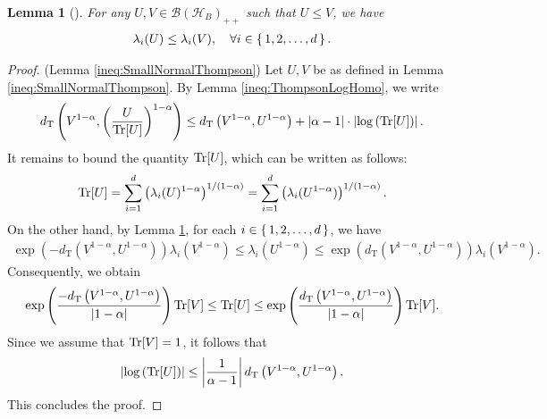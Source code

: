 \documentclass{article}
\newtheorem{lemma}[theorem]{Lemma}
\begin{document}
\begin{lemma}[{\cite[Corollary 7.7.4(c)]{Horn2013}}]
    \label{ineq:Lidskii}
    For any $U,V\in\mathcal{B}\left(\mathcal{H}_B\right)_{++}$ such that $U\leq V$, we have
    \begin{align}
        \lambda_i(U)\leq\lambda_i(V),\quad\forall i\in\set{1,2,\dots,d}.
    \end{align}
\end{lemma}
\begin{proof}(Lemma \ref{ineq:SmallNormalThompson})
    Let $U,V$ be as defined in Lemma \ref{ineq:SmallNormalThompson}.
    By Lemma \ref{ineq:ThompsonLogHomo}, we write 
    \begin{align}
        d_{\mathrm{T}}\left(V^{1-\alpha},\left(\frac{U}{\Tr[U]}\right)^{1-\alpha}\right)\leq d_{\mathrm{T}}\left(V^{1-\alpha},U^{1-\alpha}\right)+|\alpha-1|\cdot\left|\log\left(\Tr[U]\right)\right|.
    \end{align}
    It remains to bound the quantity $\Tr[U]$, which can be written as follows:
    \begin{align}
        \Tr[U]
        =\sum_{i=1}^{d}\left(\lambda_i(U)^{1-\alpha}\right)^{1/(1-\alpha)}
        =\sum_{i=1}^{d}\left(\lambda_i(U^{1-\alpha})\right)^{1/(1-\alpha)}.
    \end{align}
    On the other hand, by Lemma \ref{ineq:Lidskii}, for each $i\in\set{1,2,\dots,d}$, we have
    \begin{align}
        \exp\left(- d_{\mathrm{T}}
        \left(V^{1-\alpha},U^{1-\alpha}\right)\right)\lambda_i\left(V^{1-\alpha}\right)
        \leq \lambda_i\left(U^{1-\alpha}\right)
        \leq\exp\left( d_{\mathrm{T}}
        \left(V^{1-\alpha},U^{1-\alpha}\right)\right)\lambda_i\left(V^{1-\alpha}\right).
    \end{align}
    Consequently, we obtain
    \begin{align}
        \exp\left( \frac{-d_{\mathrm{T}}
        \left(V^{1-\alpha},U^{1-\alpha}\right)}{|1-\alpha|}\right)\Tr[V]
        \leq\Tr[U]
        \leq \exp\left( \frac{d_{\mathrm{T}}
        \left(V^{1-\alpha},U^{1-\alpha}\right)}{|1-\alpha|}\right)\Tr[V].
    \end{align}
    Since we assume that $\Tr[V]=1$, it follows that
    \begin{align}
        \abs{\log\left(\Tr[U]\right)}
        \leq\left|\frac{1}{\alpha-1}\right|d_{\mathrm{T}}
        \left(V^{1-\alpha},U^{1-\alpha}\right).
    \end{align}
    This concludes the proof.
\end{proof}
\end{document}
